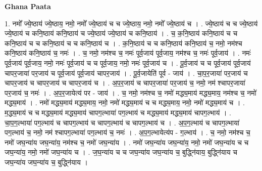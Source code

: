 \documentclass[17pt]{extarticle}
\begin{document}
\textbf{Ghana Paata } \newline

1. नमो᳚ ज्ये॒ष्ठाय॑ ज्ये॒ष्ठाय॒ नमो॒ नमो᳚ ज्ये॒ष्ठाय॑ च च ज्ये॒ष्ठाय॒ नमो॒ नमो᳚ ज्ये॒ष्ठाय॑ च । . ज्ये॒ष्ठाय॑ च च ज्ये॒ष्ठाय॑ ज्ये॒ष्ठाय॑ च कनि॒ष्ठाय॑ कनि॒ष्ठाय॑ च ज्ये॒ष्ठाय॑ ज्ये॒ष्ठाय॑ च कनि॒ष्ठाय॑ । . च॒ क॒नि॒ष्ठाय॑ कनि॒ष्ठाय॑ च च कनि॒ष्ठाय॑ च च कनि॒ष्ठाय॑ च च कनि॒ष्ठाय॑ च । . क॒नि॒ष्ठाय॑ च च कनि॒ष्ठाय॑ कनि॒ष्ठाय॑ च॒ नमो॒ नम॑श्च कनि॒ष्ठाय॑ कनि॒ष्ठाय॑ च॒ नमः॑ । . च॒ नमो॒ नम॑श्च च॒ नमः॑ पूर्व॒जाय॑ पूर्व॒जाय॒ नम॑श्च च॒ नमः॑ पूर्व॒जाय॑ । . नमः॑ पूर्व॒जाय॑ पूर्व॒जाय॒ नमो॒ नमः॑ पूर्व॒जाय॑ च च पूर्व॒जाय॒ नमो॒ नमः॑ पूर्व॒जाय॑ च । . पू॒र्व॒जाय॑ च च पूर्व॒जाय॑ पूर्व॒जाय॑ चापर॒जाया॑ पर॒जाय॑ च पूर्व॒जाय॑ पूर्व॒जाय॑ चापर॒जाय॑ । . पू॒र्व॒जायेति॑ पूर्व - जाय॑ । . चा॒प॒र॒जाया॑ पर॒जाय॑ च चापर॒जाय॑ च चापर॒जाय॑ च चापर॒जाय॑ च । . अ॒प॒र॒जाय॑ च चापर॒जाया॑ पर॒जाय॑ च॒ नमो॒ नम॑ श्चापर॒जाया॑ पर॒जाय॑ च॒ नमः॑ । . अ॒प॒र॒जायेत्य॑ पर - जाय॑ । . च॒ नमो॒ नम॑श्च च॒ नमो॑ मद्ध्य॒माय॑ मद्ध्य॒माय॒ नम॑श्च च॒ नमो॑ मद्ध्य॒माय॑ । . नमो॑ मद्ध्य॒माय॑ मद्ध्य॒माय॒ नमो॒ नमो॑ मद्ध्य॒माय॑ च च मद्ध्य॒माय॒ नमो॒ नमो॑ मद्ध्य॒माय॑ च । . म॒द्ध्य॒माय॑ च च मद्ध्य॒माय॑ मद्ध्य॒माय॑ चापग॒ल्भाया॑ पग॒ल्भाय॑ च मद्ध्य॒माय॑ मद्ध्य॒माय॑ चापग॒ल्भाय॑ । . चा॒प॒ग॒ल्भाया॑ पग॒ल्भाय॑ च चापग॒ल्भाय॑ च चापग॒ल्भाय॑ च चापग॒ल्भाय॑ च । . अ॒प॒ग॒ल्भाय॑ च चापग॒ल्भाया॑ पग॒ल्भाय॑ च॒ नमो॒ नम॑ श्चापग॒ल्भाया॑ पग॒ल्भाय॑ च॒ नमः॑ । . अ॒प॒ग॒ल्भायेत्य॑प - ग॒ल्भाय॑ । . च॒ नमो॒ नम॑श्च च॒ नमो॑ जघ॒न्या॑य जघ॒न्या॑य॒ नम॑श्च च॒ नमो॑ जघ॒न्या॑य । . नमो॑ जघ॒न्या॑य जघ॒न्या॑य॒ नमो॒ नमो॑ जघ॒न्या॑य च च जघ॒न्या॑य॒ नमो॒ नमो॑ जघ॒न्या॑य च । . ज॒घ॒न्या॑य च च जघ॒न्या॑य जघ॒न्या॑य च॒ बुद्ध्नि॑याय॒ बुद्ध्नि॑याय च जघ॒न्या॑य जघ॒न्या॑य च॒ बुद्ध्नि॑याय । \newline
\end{document}

